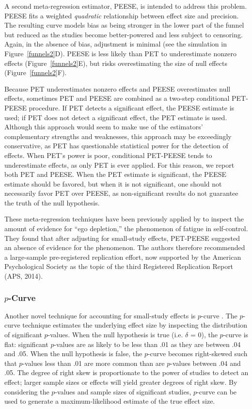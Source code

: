 \documentclass[man, mask]{apa6}
\begin{document}
A second meta-regression estimator, PEESE, is intended to address this problem. PEESE fits a weighted {\em quadratic} relationship between effect size and precision. The resulting curve models bias as being stronger in the lower part of the funnel but reduced as the studies become better-powered and less subject to censoring. Again, in the absence of bias, adjustment is minimal (see the simulation in Figure~\ref{funnels2}D). PEESE is less likely than PET to underestimate nonzero effects (Figure~\ref{funnels2}E), but risks overestimating the size of null effects (Figure~\ref{funnels2}F).

Because PET underestimates nonzero effects and PEESE overestimates null effects, sometimes PET and PEESE are combined as a two-step conditional PET-PEESE procedure. If PET detects a significant effect, the PEESE estimate is used; if PET does not detect a significant effect, the PET estimate is used. Although this approach would seem to make use of the estimators' complementary strengths and weaknesses, this approach may be exceedingly conservative, as PET has questionable statistical power for the detection of effects. When PET's power is poor, conditional PET-PEESE tends to underestimate effects, as only PET is ever applied. For this reason, we report both PET and PEESE. When the PET estimate is significant, the PEESE estimate should be favored, but when it is not significant, one should not necessarily favor PET over PEESE, as non-significant results do not guarantee the truth of the null hypothesis.

These meta-regression techniques have been previously applied by \citet{Carter:McCullough:2014} to inspect the amount of evidence for ``ego depletion,'' the phenomenon of fatigue in self-control. They found that after adjusting for small-study effects, PET-PEESE suggested an absence of evidence for the phenomenon. The authors therefore recommended a large-sample pre-registered replication effort, now supported by the American Psychological Society as the topic of the third Registered Replication Report (APS, 2014). \nocite{APS:2014}


\subsubsection{$p$-Curve}
Another novel technique for accounting for small-study effects is $p$-curve \citep{Simonsohn:etal:2014,Simonsohn:etal:2014b}. The $p$-curve technique estimates the underlying effect size by inspecting the distribution of significant $p$-values. 
When the null hypothesis is true (i.e. $\delta$ = 0), the $p$-curve is flat: significant $p$-values are as likely to be less than .01 as they are between .04 and .05. When the null hypothesis is false, the $p$-curve becomes right-skewed such that $p$-values less than .01 are more common than are $p$-values between .04 and .05. The degree of right skew is proportionate to the power of studies to detect an effect; larger sample sizes or effects will yield greater degrees of right skew. By considering the $p$-values and sample sizes of significant studies, $p$-curve can be used to generate a maximum-likelihood estimate of the true effect size.
\end{document}
